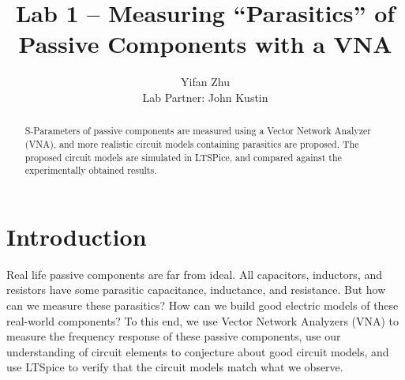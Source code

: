 \documentclass{article}
\begin{document}
\title{Lab 1 -- Measuring ``Parasitics'' of Passive Components with a VNA}
\author{
    Yifan Zhu\\
    Lab Partner: John Kustin
}
\maketitle

\begin{abstract}
    S-Parameters of passive components are measured using a Vector Network Analyzer (VNA), and more realistic circuit models containing parasitics are proposed.
    The proposed circuit models are simulated in LTSPice, and compared against the experimentally obtained results.
\end{abstract}

\section{Introduction}
Real life passive components are far from ideal.
All capacitors, inductors, and resistors have some parasitic capacitance, inductance, and resistance.
But how can we measure these parasitics?
How can we build good electric models of these real-world components?
To this end, we use Vector Network Analyzers (VNA) to measure the frequency response of these passive components, use our understanding of circuit elements to conjecture about good circuit models, and use LTSpice to verify that the circuit models match what we observe.
\end{document}
